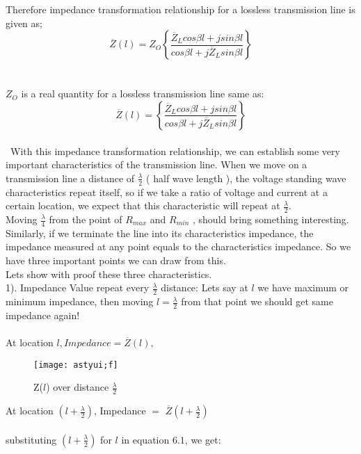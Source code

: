 Therefore impedance transformation relationship for a lossless transmission line is given as;
\begin{equation}
\overline{Z}(l) = Z_{O}\left\lbrace \frac{\overline{Z}_Lcos\beta l + jsin\beta l}{cos\beta l + j\overline{Z}_Lsin\beta l}\right\rbrace 
\end{equation}\\\\
$Z_O$ is a real quantity for a lossless transmission line same as:
\begin{equation}
\overline{Z}(l) = \left\lbrace \frac{\overline{Z}_Lcos\beta l + jsin\beta l}{cos\beta l + j\overline{Z}_Lsin\beta l}\right\rbrace 
\end{equation}\\\
With this impedance transformation relationship, we can establish some very important characteristics of the transmission line. When we move on a transmission line a distance of $\frac{\lambda}{2}$ ( half wave length ), the voltage standing wave characteristics repeat itself, so if we take a ratio of voltage and current at a certain location, we expect that this characteristic will repeat at $\frac{\lambda}{2}$.\\
Moving $\frac{\lambda}{4}$ from the point of $R_{max}$ and $R_{min}$ , should bring something interesting. Similarly, if we terminate the line into its characteristics impedance, the impedance measured at any point equals to the characteristics impedance. So we have three important points we can draw from this.\\
Lets show with proof these three characteristics.\\

1).  Impedance Value repeat every $\frac{\lambda}{2}$ distance: Lets say at $l$ we have maximum or minimum impedance, then moving $l=\frac{\lambda}{2}$ from that point we should get same impedance again!\\\\
At location $l , Impedance =\overline{Z}(l),$\\
\begin{figure}[h]
	\centering
	\texttt{[image: astyui;f]}
	\caption{Z($l$) over distance $\frac{\lambda}{2}$}
	\label{fig:astyuif}
\end{figure}

 At location ${(l+\frac{\lambda}{2})}$, Impedance  $=$ $\overline{Z}(l+\frac{\lambda}{2})$\\\\
 substituting ${(l+\frac{\lambda}{2})}$ for $l$ in equation $6.1$, we get: 
 
